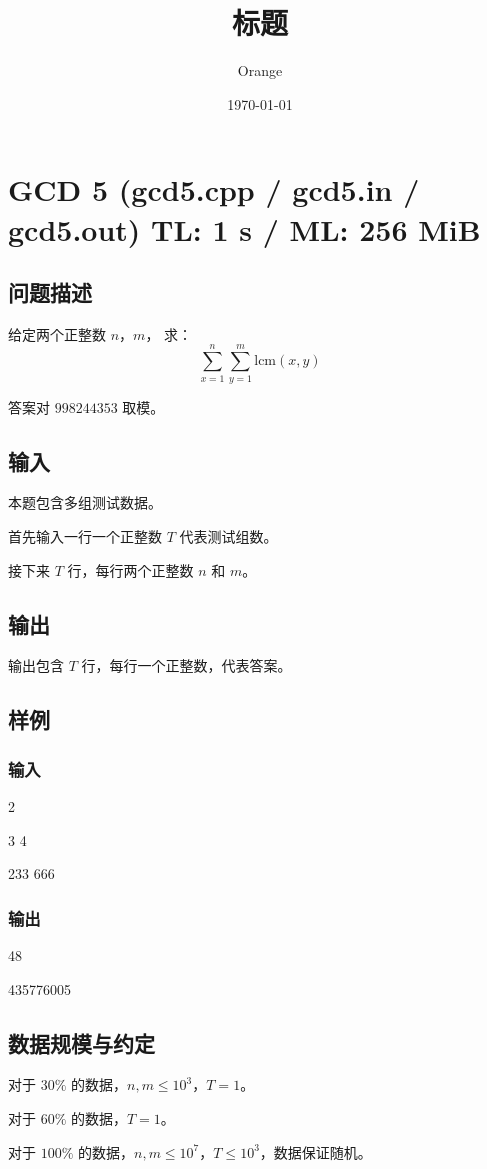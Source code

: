 \documentclass[UTF8]{article}
\title{标题}
\author{Orange}
\date{\today}
\begin{document}
	\heiti

	\section{GCD 5 \small(gcd5.cpp / gcd5.in / gcd5.out) TL: 1 s / ML: 256 MiB}
	\subsection{问题描述}
	给定两个正整数 $n$，$m$，
	求：
	$$
	\sum_{x = 1}^{n} \sum_{y = 1}^{m} \mathrm{lcm}(x, y)
	$$

	答案对 $998244353$ 取模。

	\subsection{输入}
	本题包含多组测试数据。

	首先输入一行一个正整数 $T$ 代表测试组数。

	接下来 $T$ 行，每行两个正整数 $n$ 和 $m$。

	\subsection{输出}
	输出包含 $T$ 行，每行一个正整数，代表答案。

	\subsection{样例}
	\subsubsection{输入}
	2

	3 4

	233 666

	\subsubsection{输出}
	48

	435776005

	\subsection{数据规模与约定}
	对于 $30\%$ 的数据，$n, m \le 10^3$，$T = 1$。

	对于 $60\%$ 的数据，$T = 1$。

	对于 $100\%$ 的数据，$n, m \le 10^7$，$T \le 10^3$，数据保证随机。
\end{document}
